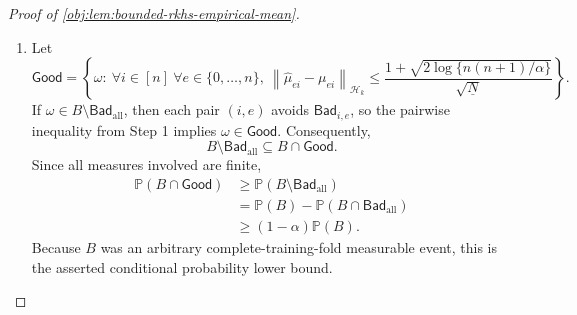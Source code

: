 \begin{proof}[Proof of \cref{obj:lem:bounded-rkhs-empirical-mean}]
\begin{enumerate}
\item Let
\[
\mathsf{Good}
=
\left\{
\omega:\ 
\forall i\in[n]\ \forall e\in\{0,\ldots,n\},\
\left\|\widehat\mu_{ei}-\mu_{ei}\right\|_{\mathcal H_k}
\le
\frac{1+\sqrt{2\log\{n(n+1)/\alpha\}}}{\sqrt{\underline N}}
\right\}.
\]
If \(\omega\in B\setminus\mathsf{Bad}_{\mathrm{all}}\), then each pair \((i,e)\) avoids \(\mathsf{Bad}_{i,e}\), so the pairwise inequality from Step 1 implies \(\omega\in\mathsf{Good}\).  Consequently,
\[
B\setminus\mathsf{Bad}_{\mathrm{all}}\subseteq B\cap\mathsf{Good}.
\]
Since all measures involved are finite,
\[
\begin{aligned}
\mathbb P(B\cap\mathsf{Good})
&\ge
\mathbb P(B\setminus\mathsf{Bad}_{\mathrm{all}})\\
&=
\mathbb P(B)-\mathbb P(B\cap\mathsf{Bad}_{\mathrm{all}})\\
&\ge
(1-\alpha)\mathbb P(B).
\end{aligned}
\]
Because \(B\) was an arbitrary complete-training-fold measurable event, this is the asserted conditional probability lower bound. %
\end{enumerate}
\end{proof}
